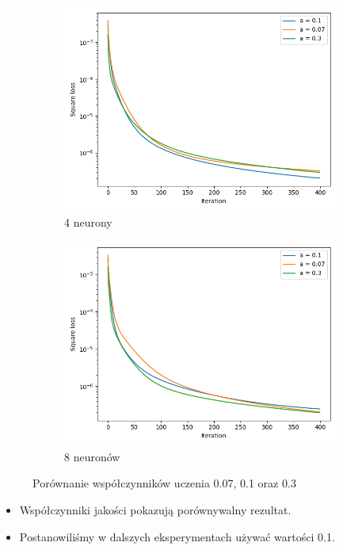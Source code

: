 \documentclass[12pt,a4paper]{article}
\begin{document}
\begin{figure}[h]
  \centering
\begin{subfigure}{0.5\textwidth}
  \includegraphics[width=\linewidth]{charts/learning_rates/4neurons2.png}
  \caption{4 neurony}
  \label{}
\end{subfigure}\hfil
\begin{subfigure}{0.5\textwidth}
  \includegraphics[width=\linewidth]{charts/learning_rates/8neurons.png}
  \caption{8 neuronów}
  \label{}
\end{subfigure}
\caption{Porównanie współczynników uczenia 0.07, 0.1 oraz 0.3}
\label{}
\end{figure}

\begin{itemize}
  \item   Współczynniki jakości pokazują porównywalny rezultat.
  \item   Postanowiliśmy w dalszych eksperymentach używać wartości 0.1.
\end{itemize}
\end{document}
